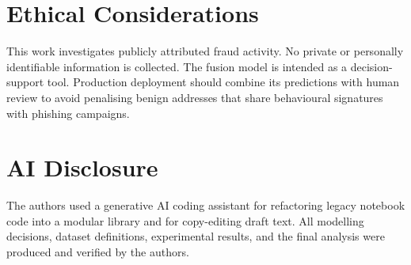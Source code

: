 \documentclass[conference]{IEEEtran}
\begin{document}
\section*{Ethical Considerations}
This work investigates publicly attributed fraud activity. No private
or personally identifiable information is collected. The fusion model
is intended as a decision-support tool. Production deployment should
combine its predictions with human review to avoid penalising benign
addresses that share behavioural signatures with phishing campaigns.

\section*{AI Disclosure}
The authors used a generative AI coding assistant for refactoring legacy
notebook code into a modular library and for copy-editing draft text.
All modelling decisions, dataset definitions, experimental results, and
the final analysis were produced and verified by the authors.



\end{document}
